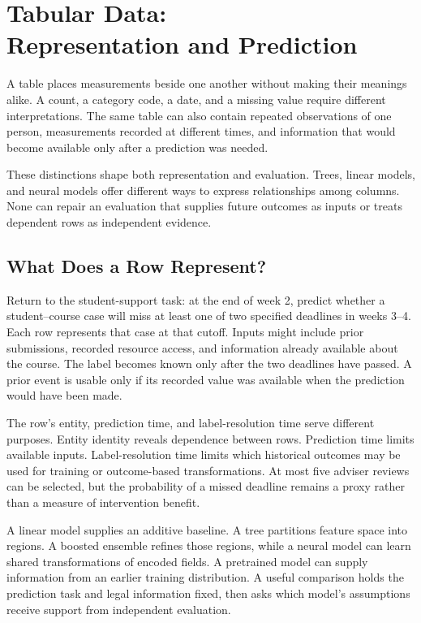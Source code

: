 \begingroup
\raggedbottom
{}
\chapter[Tabular Data: Representation and Prediction]{Tabular Data:\\Representation and Prediction}
\label{ch:tabular}

A table places measurements beside one another without making their meanings alike. A count, a category code, a date, and a missing value require different interpretations. The same table can also contain repeated observations of one person, measurements recorded at different times, and information that would become available only after a prediction was needed.

These distinctions shape both representation and evaluation. Trees, linear models, and neural models offer different ways to express relationships among columns. None can repair an evaluation that supplies future outcomes as inputs or treats dependent rows as independent evidence.

\section{What Does a Row Represent?}

Return to the student-support task: at the end of week 2, predict whether a student--course case will miss at least one of two specified deadlines in weeks 3--4. Each row represents that case at that cutoff. Inputs might include prior submissions, recorded resource access, and information already available about the course. The label becomes known only after the two deadlines have passed. A prior event is usable only if its recorded value was available when the prediction would have been made.

The row's entity, prediction time, and label-resolution time serve different purposes. Entity identity reveals dependence between rows. Prediction time limits available inputs. Label-resolution time limits which historical outcomes may be used for training or outcome-based transformations. At most five adviser reviews can be selected, but the probability of a missed deadline remains a proxy rather than a measure of intervention benefit.

A linear model supplies an additive baseline. A tree partitions feature space into regions. A boosted ensemble refines those regions, while a neural model can learn shared transformations of encoded fields. A pretrained model can supply information from an earlier training distribution. A useful comparison holds the prediction task and legal information fixed, then asks which model's assumptions receive support from independent evaluation.

